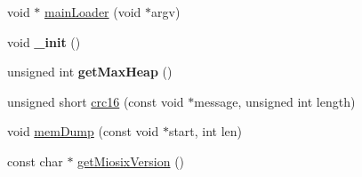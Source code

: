 \begin{DoxyCompactItemize}
\item 
void $\ast$ \hyperlink{namespacemiosix_ae328e91fe5c236862c972a552f4d187f}{main\-Loader} (void $\ast$argv)
\item 
\hypertarget{namespacemiosix_aac1f3cb4761c8a16fb2aa7ced068aabd}{void {\bfseries \-\_\-init} ()}\label{namespacemiosix_aac1f3cb4761c8a16fb2aa7ced068aabd}

\item 
\hypertarget{namespacemiosix_a539dd981ce968463ede8e1e7ac5864aa}{unsigned int {\bfseries get\-Max\-Heap} ()}\label{namespacemiosix_a539dd981ce968463ede8e1e7ac5864aa}

\item 
unsigned short \hyperlink{namespacemiosix_a8ac4d7be77243e2d2225ba4ef3678db4}{crc16} (const void $\ast$message, unsigned int length)
\item 
void \hyperlink{group___util_gadb6acdd9cbe72a6198e7b3b4c7d3d702}{mem\-Dump} (const void $\ast$start, int len)
\item 
const char $\ast$ \hyperlink{group___util_gadc3015d9be3c5eb12fe691ca0ca9251b}{get\-Miosix\-Version} ()
\end{DoxyCompactItemize}
